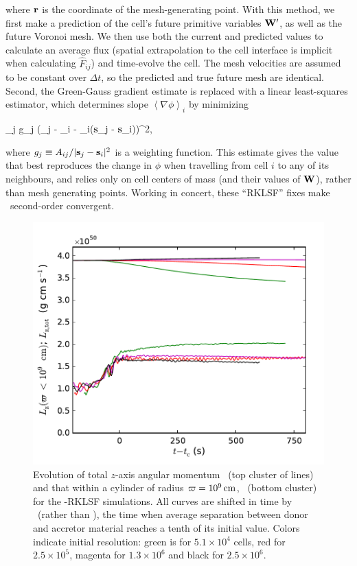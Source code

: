 \noindent where ${\bf r}$ is the coordinate of the mesh-generating point.  With this method, we first make a prediction of the cell's future primitive variables ${\bf W}^\prime$, as well as the future Voronoi mesh.  We then use both the current and predicted values to calculate an average flux (spatial extrapolation to the cell interface is implicit when calculating $\hat{F}_{ij}$) and time-evolve the cell.  The mesh velocities are assumed to be constant over $\Delta t$, so the predicted and true future mesh are identical.  Second, the Green-Gauss gradient estimate is replaced with a linear least-squares estimator, which determines slope $\left\langle \nabla \phi \right\rangle_i$ by minimizing

\eqbegin
\sum_j g_j \left(\phi_j - \phi_i - \left\langle \nabla \phi \right\rangle_i({\bf s}_j - {\bf s}_i)\right)^2,
\label{eq:c3_leastsq_grad}
\eqend

\noindent where $g_j \equiv A_{ij}/|{\bf s}_j - {\bf s}_i|^2$ is a weighting function.  This estimate gives the value that best reproduces the change in $\phi$ when travelling from cell $i$ to any of its neighbours, and relies only on cell centers of mass (and their values of ${\bf W}$), rather than mesh generating points.  Working in concert, these ``RKLSF'' fixes make \arepo\ second-order convergent.

\begin{figure}
\centering
\includegraphics[angle=0,width=0.6\columnwidth]{chapter3_zhu+u/figures/lz_development2.pdf}
\caption{Evolution of total $z$-axis angular momentum \Lztot\ (top cluster of lines) and that within a cylinder of radius $\varpi = 10^9\,\mathrm{cm}$, \Lzinner\ (bottom cluster) for the \arepo-RKLSF simulations.  All curves are shifted in time by \tcoal\ (rather than \tlm), the time when average separation between donor and accretor material reaches a tenth of its initial value.  Colors indicate initial resolution: green is for $5.1\times10^4$ cells, red for $2.5\times10^{5}$, magenta for $1.3\times10^{6}$ and black for $2.5\times10^6$.}
\label{fig:c3_fix_angmo_nar}
\end{figure}

